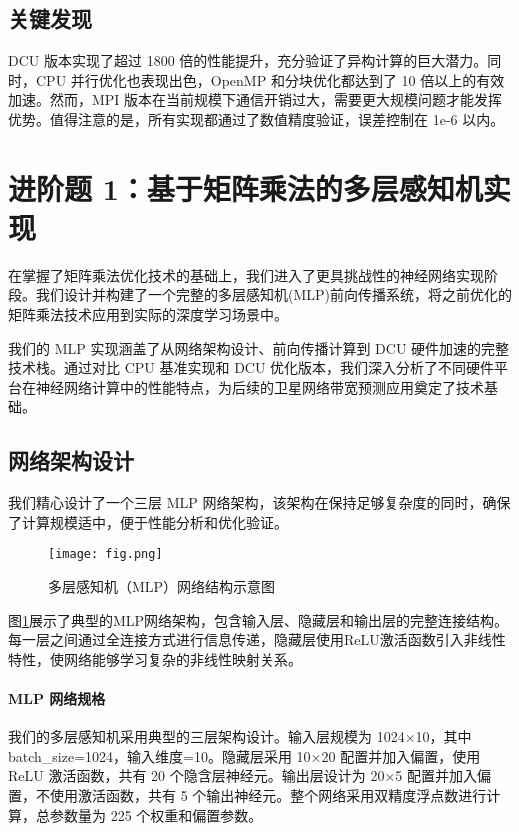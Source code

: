 \documentclass[a4paper]{article}
\begin{document}
\subsection{关键发现}

DCU 版本实现了超过 1800 倍的性能提升，充分验证了异构计算的巨大潜力。同时，CPU 并行优化也表现出色，OpenMP 和分块优化都达到了 10 倍以上的有效加速。然而，MPI 版本在当前规模下通信开销过大，需要更大规模问题才能发挥优势。值得注意的是，所有实现都通过了数值精度验证，误差控制在 1e-6 以内。

\section{进阶题 1：基于矩阵乘法的多层感知机实现}

在掌握了矩阵乘法优化技术的基础上，我们进入了更具挑战性的神经网络实现阶段。我们设计并构建了一个完整的多层感知机(MLP)前向传播系统，将之前优化的矩阵乘法技术应用到实际的深度学习场景中。

我们的 MLP 实现涵盖了从网络架构设计、前向传播计算到 DCU 硬件加速的完整技术栈。通过对比 CPU 基准实现和 DCU 优化版本，我们深入分析了不同硬件平台在神经网络计算中的性能特点，为后续的卫星网络带宽预测应用奠定了技术基础。

\subsection{网络架构设计}

我们精心设计了一个三层 MLP 网络架构，该架构在保持足够复杂度的同时，确保了计算规模适中，便于性能分析和优化验证。

\begin{figure}[H]
\centering
\texttt{[image: fig.png]}
\caption{多层感知机（MLP）网络结构示意图}
\label{fig:mlp_architecture}
\end{figure}

图\ref{fig:mlp_architecture}展示了典型的MLP网络架构，包含输入层、隐藏层和输出层的完整连接结构。每一层之间通过全连接方式进行信息传递，隐藏层使用ReLU激活函数引入非线性特性，使网络能够学习复杂的非线性映射关系。

\paragraph{MLP 网络规格}

我们的多层感知机采用典型的三层架构设计。输入层规模为 1024×10，其中 batch\_size=1024，输入维度=10。隐藏层采用 10×20 配置并加入偏置，使用 ReLU 激活函数，共有 20 个隐含层神经元。输出层设计为 20×5 配置并加入偏置，不使用激活函数，共有 5 个输出神经元。整个网络采用双精度浮点数进行计算，总参数量为 225 个权重和偏置参数。
\end{document}
